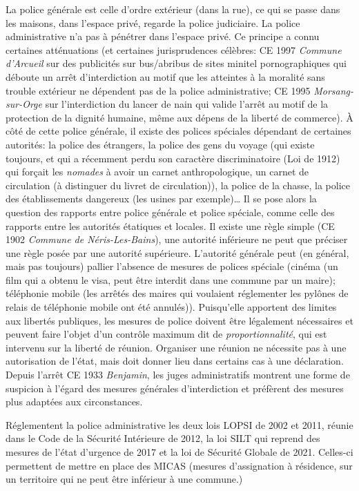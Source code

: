 \documentclass[math]{cours}
\begin{document}
La police générale est celle d'ordre extérieur (dans la rue), ce qui se passe dans les maisons, dans l'espace privé, regarde la police judiciaire.
La police administrative n'a pas à pénétrer dans l'espace privé.
Ce principe a connu certaines atténuations (et certaines jurisprudences célèbres: CE 1997 \emph{Commune d'Arcueil} sur des publicités sur bus/abribus de sites minitel pornographiques qui déboute un arrêt d'interdiction au motif que les atteintes à la moralité sans trouble extérieur ne dépendent pas de la police administrative; CE 1995 \emph{Morsang-sur-Orge} sur l'interdiction du lancer de nain qui valide l'arrêt au motif de la protection de la dignité humaine, même aux dépens de la liberté de commerce).
À côté de cette police générale, il existe des polices spéciales dépendant de certaines autorités: la police des étrangers, la police des gens du voyage (qui existe toujours, et qui a récemment perdu son caractère discriminatoire (Loi de 1912) qui forçait les \emph{nomades} à avoir un carnet anthropologique, un carnet de circulation (à distinguer du livret de circulation)), la police de la chasse, la police des établissements dangereux (les usines par exemple)\ldots
Il se pose alors la question des rapports entre police générale et police spéciale, comme celle des rapports entre les autorités étatiques et locales.
Il existe une règle simple (CE 1902 \emph{Commune de Néris-Les-Bains}), une autorité inférieure ne peut que préciser une règle posée par une autorité supérieure.
L'autorité générale peut (en général, mais pas toujours) pallier l'absence de mesures de polices spéciale (cinéma (un film qui a obtenu le visa, peut être interdit dans une commune par un maire);
téléphonie mobile (les arrêtés des maires qui voulaient réglementer les pylônes de relais de téléphonie mobile ont été annulés)).
Puisqu'elle apportent des limites aux libertés publiques, les mesures de police doivent être légalement nécessaires et peuvent faire l'objet d'un contrôle maximum dit de \emph{proportionnalité}, qui est intervenu sur la liberté de réunion.
Organiser une réunion ne nécessite pas à une autorisation de l'état, mais doit donner lieu dans certains cas à une déclaration.
Depuis l'arrêt CE 1933 \emph{Benjamin}, les juges administratifs montrent une forme de suspicion à l'égard des mesures générales d'interdiction et préfèrent des mesures plus adaptées aux circonstances.

Réglementent la police administrative les deux lois LOPSI de 2002 et 2011, réunie dans le Code de la Sécurité Intérieure de 2012, la loi SILT qui reprend des mesures de l'état d'urgence de 2017 et la loi de Sécurité Globale de 2021.
Celles-ci permettent de mettre en place des MICAS (mesures d'assignation à résidence, sur un territoire qui ne peut être inférieur à une commune.)
\end{document}

